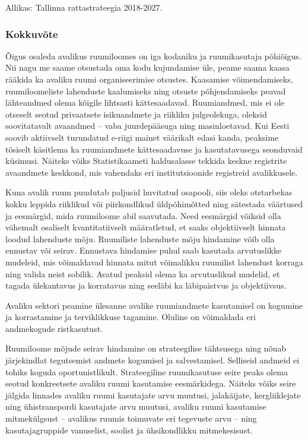 \documentclass[estonian,]{article}
\begin{document}
\begin{imgsource}
{Allikas:} Tallinna rattastrateegia 2018-2027.
\end{imgsource}

\hypertarget{kokkuvuxf5te-6}{%
\subsubsection*{Kokkuvõte}\label{kokkuvuxf5te-6}}

Õigus osaleda avalikus ruumiloomes on iga kodaniku ja ruumikasutaja põhiõigus. Nii nagu me saame otsustada oma kodu kujundamise üle, peame saama kaasa rääkida ka avaliku ruumi organiseerimise otsustes. Kaasamise võimendamiseks, ruumiloomeliste lahenduste kaalumiseks ning otsuste põhjendamiseks peavad lähteandmed olema kõigile lihtsasti kättesaadavad. Ruumiandmed, mis ei ole otseselt seotud privaatsete isikuandmete ja riikliku julgeolekuga, oleksid soovitatavalt avaandmed -- vaba juurdepääsuga ning masinloetavad. Kui Eesti soovib aktiivselt turundatud e-riigi mainet väärikalt edasi kanda, peaksime tõsiselt käsitlema ka ruumiandmete kättesaadavuse ja kasutatavusega seonduvaid küsimusi. Näiteks võiks Statistikaameti haldusalasse tekkida keskne registrite avaandmete keskkond, mis vahendaks eri institutsioonide registreid avalikkusele.

Kuna avalik ruum puudutab paljusid huvitatud osapooli, siis oleks otstarbekas kokku leppida riiklikud või piirkondlikud üldpõhimõtted ning sätestada väärtused ja eesmärgid, mida ruumiloome abil saavutada. Need eesmärgid võiksid olla vähemalt osaliselt kvantitatiivselt määratletud, et saaks objektiivselt hinnata loodud lahenduste mõju. Ruumiliste lahenduste mõju hindamine võib olla ennustav või seirav. Ennustava hindamise puhul saab kasutada arvutuslikke mudeleid, mis võimaldavad hinnata mitut võimalikku ruumilist lahendust korraga ning valida neist sobilik. Avatud peaksid olema ka arvutuslikud mudelid, et tagada ülekantavus ja korratavus ning seeläbi ka läbipaistvus ja objektiivsus.

\begin{blockquote-right}
Avaliku sektori peamine ülesanne avalike ruumiandmete kasutamisel on
kogumine ja korrastamine ja terviklikkuse tagamine. Oluline on
võimaldada eri andmekogude ristkasutust.
\end{blockquote-right}

Ruumiloome mõjude seirav hindamine on strateegilise tähtsusega ning nõuab järjekindlat tegutsemist andmete kogumisel ja salvestamisel. Selliseid andmeid ei tohiks koguda oportunistlikult. Strateegiline ruumikasutuse seire peaks olema seotud konkreetsete avaliku ruumi kasutamise eesmärkidega. Näiteks võiks seire jälgida linnades avaliku ruumi kasutajate arvu muutusi, jalakäijate, kergliiklejate ning ühistranspordi kasutajate arvu muutusi, avaliku ruumi kasutamise mitmekülgsust -- avalikus ruumis toimuvate eri tegevuste arvu -- ning kasutajagruppide vanuselist, soolist ja ühsikondlikku mitmekesisust.
\end{document}

